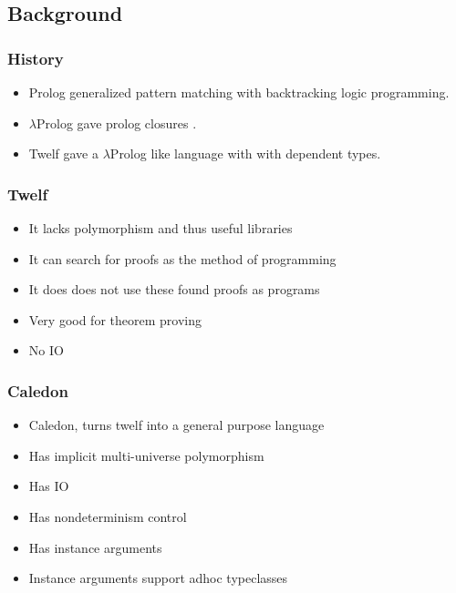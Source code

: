 \subsection{Background}

\begin{frame}
\frametitle{History}

\begin{itemize}
\item Prolog generalized pattern matching with backtracking logic programming.
\item $\lambda$Prolog gave prolog closures \citep{miller1988overview}.
\item Twelf \citep{pfenning1999system} gave a $\lambda$Prolog like language with with dependent types.
\end{itemize}
\end{frame}


\begin{frame}
\frametitle{Twelf}
\begin{itemize}
\item It lacks polymorphism and thus useful libraries
\item It can search for proofs as the method of programming 
\item It does does not use these found proofs as programs
\item Very good for theorem proving
\item No IO
\end{itemize}

\end{frame}


\begin{frame}

\frametitle{Caledon}
\begin{itemize}
\item Caledon, turns twelf into a general purpose language
\item Has implicit multi-universe polymorphism
\item Has IO
\item Has nondeterminism control
\item Has instance arguments
\item Instance arguments support adhoc typeclasses
\end{itemize}
\end{frame}

